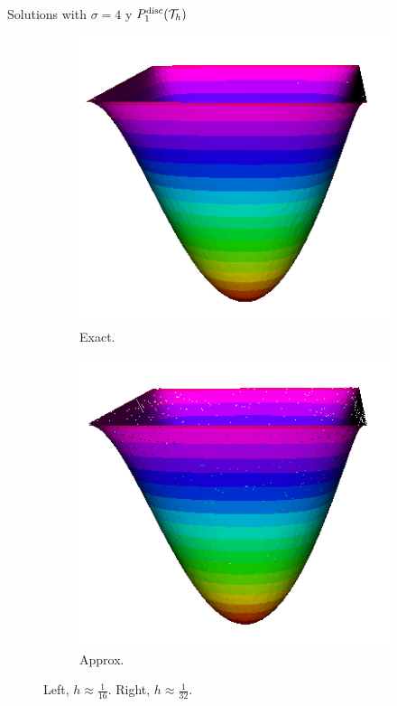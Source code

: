 \begin{frame}{Solutions with $\sigma=4$ y $\relax{P}^{\text{disc}}_1(\mathcal{T}_h)$}
\begin{figure}[h!]
\begin{subfigure}[b]{0.1\textwidth}
			\end{subfigure}
			\begin{subfigure}[b]{0.2\textwidth}
				\centering
				\includegraphics[scale=0.16]{img/Difusion/Recortes/steady_diffusion_exact_n_32.png}
				\caption{\scriptsize Exact.}
			\end{subfigure}
			\begin{subfigure}[b]{0.2\textwidth}
				\centering
				\includegraphics[scale=0.16]{img/Difusion/Recortes/steady_diffusion_approx_n_32.png}
				\caption{\scriptsize Approx.}
			\end{subfigure}
			\caption{\scriptsize Left, $h\approx\frac{1}{16}$. Right, $h\approx\frac{1}{32}$.}
		\end{figure}
		\end{frame}
		
